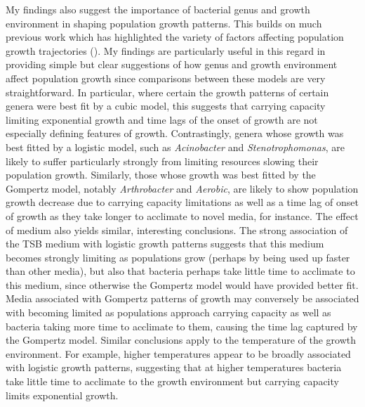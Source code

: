 \documentclass[11pt]{article}
\begin{document}
	My findings also suggest the importance of bacterial genus and growth environment in shaping population growth patterns. This builds on much previous work which has highlighted the variety of factors affecting population growth trajectories (\cite{sibly2002population, dinsmore2010assessment}). My findings are particularly useful in this regard in providing simple but clear suggestions of how genus and growth environment affect population growth since comparisons between these models are very straightforward. In particular, where certain the growth patterns of certain genera were best fit by a cubic model, this suggests that carrying capacity limiting exponential growth and time lags of the onset of growth are not especially defining features of growth. Contrastingly, genera whose growth was best fitted by a logistic model, such as \textit{Acinobacter} and \textit{Stenotrophomonas}, are likely to suffer particularly strongly from limiting resources slowing their population growth. Similarly, those whose growth was best fitted by the Gompertz model, notably \textit{Arthrobacter} and \textit{Aerobic}, are likely to show population growth decrease due to carrying capacity limitations as well as a time lag of onset of growth as they take longer to acclimate to novel media, for instance. The effect of medium also yields similar, interesting conclusions. The strong association of the TSB medium with logistic growth patterns suggests that this medium becomes strongly limiting as populations grow (perhaps by being used up faster than other media), but also that bacteria perhaps take little time to acclimate to this medium, since otherwise the Gompertz model would have provided better fit. Media associated with Gompertz patterns of growth may conversely be associated with becoming limited as populations approach carrying capacity as well as bacteria taking more time to acclimate to them, causing the time lag captured by the Gompertz model. Similar conclusions apply to the temperature of the growth environment. For example, higher temperatures appear to be broadly associated with logistic growth patterns, suggesting that at higher temperatures bacteria take little time to acclimate to the growth environment but carrying capacity limits exponential growth.
	
\end{document}
